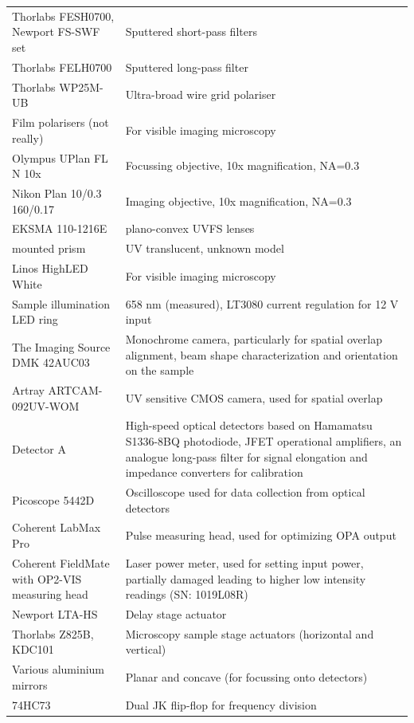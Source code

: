 \documentclass[twoside,openright]{scrreprt}
\begin{document}
\begin{longtable}{p{}p{}}
    Thorlabs FESH0700, Newport FS-SWF set & Sputtered short-pass filters \\
    Thorlabs FELH0700 & Sputtered long-pass filter \\
    Thorlabs WP25M-UB & Ultra-broad wire grid polariser \\
    Film polarisers (not really) & For visible imaging microscopy \\
    Olympus UPlan FL N 10x & Focussing objective, 10x magnification, NA=0.3 \\
    Nikon Plan 10/0.3 160/0.17 & Imaging objective, 10x magnification, NA=0.3 \\
    EKSMA 110-1216E & plano-convex UVFS lenses\\
    mounted prism & UV translucent, unknown model\\
    Linos HighLED White & For visible imaging microscopy \\
    Sample illumination LED ring & 658 nm (measured), LT3080 current regulation for 12 V input \\
    The Imaging Source DMK 42AUC03 & Monochrome camera, particularly for spatial overlap alignment, beam shape characterization and orientation on the sample \\
    Artray ARTCAM-092UV-WOM & UV sensitive CMOS camera, used for spatial overlap\\
    Detector A & High-speed optical detectors based on Hamamatsu S1336-8BQ photodiode, JFET operational amplifiers, an analogue  long-pass filter for signal elongation and impedance converters for calibration \\
    Picoscope 5442D & Oscilloscope used for data collection from optical detectors \\
    Coherent LabMax Pro & Pulse measuring head, used for optimizing OPA output \\
    Coherent FieldMate with OP2-VIS measuring head & Laser power meter, used for setting input power, partially damaged leading to higher low intensity readings (SN: 1019L08R) \\
    Newport LTA-HS & Delay stage actuator \\
    Thorlabs Z825B, KDC101 & Microscopy sample stage actuators (horizontal and vertical) \\
    Various aluminium mirrors & Planar and concave (for focussing onto detectors) \\
    74HC73 & Dual JK flip-flop for frequency division
\end{longtable}
\end{document}
